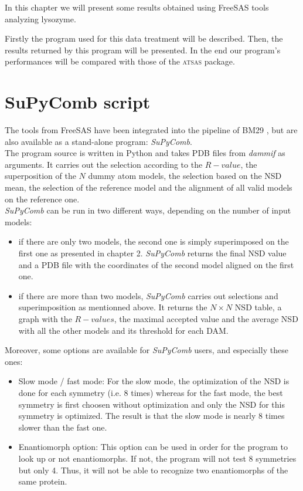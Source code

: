 \documentclass[a4paper, 11pt]{report}
\begin{document}
In this chapter we will present some results obtained using FreeSAS 
tools analyzing lysozyme.

Firstly the program used for this data treatment will be described. 
Then, the results returned by this program will be presented. 
In the end our program's performances will be compared with those of 
the \textsc{atsas} package.

\section{SuPyComb script}

The tools from FreeSAS have been integrated into the pipeline of BM29 
\cite{BM29news}, but are also available as a stand-alone program: 
\textit{SuPyComb}.\\

The program source is written in Python and takes PDB files from 
\textit{dammif} as arguments. 
It carries out the selection according to the $R-value$, the 
superposition of the $N$ dummy atom models, the selection based on the 
NSD mean, the selection of the reference model and the alignment of 
all valid models on the reference one.\\
\textit{SuPyComb} can be run in two different ways, depending on the 
number of input models:
\begin{itemize}
  \item if there are only two models, the second one is simply 
        superimposed on the first one as presented in chapter 2.
        \textit{SuPyComb} returns the final NSD value and a PDB file 
        with the coordinates of the second model aligned on the first one.
  \item if there are more than two models, \textit{SuPyComb} carries out 
        selections and superimposition as mentionned above. 
        It returns the $N \times N$ NSD table, a graph with the $R-values$, 
        the maximal accepted value and the average NSD with all the other 
        models and its threshold for each DAM.
\end{itemize}
Moreover, some options are available for \textit{SuPyComb} users, and 
especially these ones:
\begin{itemize}
  \item Slow mode / fast mode:
  For the slow mode, the optimization of the NSD is done for each symmetry 
  (i.e. 8 times) whereas for the fast mode, the best symmetry is first 
  choosen without optimization and only the NSD for this symmetry is 
  optimized.
  The result is that the slow mode is nearly 8 times slower than the fast 
  one.
  \item Enantiomorph option:
  This option can be used in order for the program to look up or not 
  enantiomorphs. 
  If not, the program will not test 8 symmetries but only 4. 
  Thus, it will not be able to recognize two enantiomorphs of the 
  same protein.
\end{itemize}
\end{document}
